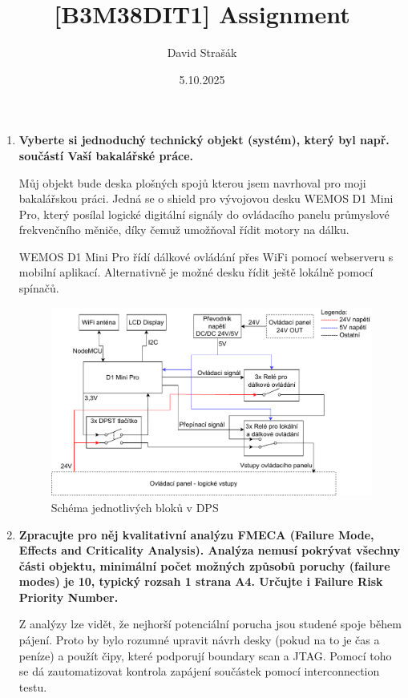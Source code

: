 \documentclass[10pt]{article} %
\title{[B3M38DIT1] Assignment}
\author{David Strašák}
\date{5.10.2025}
\begin{document}
	\maketitle
	
	\begin{enumerate}
		\item \textbf{Vyberte si jednoduchý technický objekt (systém), který byl např. součástí Vaší bakalářské práce. }
		
		Můj objekt bude deska plošných spojů kterou jsem navrhoval pro moji bakalářskou práci. Jedná se o shield pro vývojovou desku WEMOS D1 Mini Pro, který posílal logické digitální signály do ovládacího panelu průmyslové frekvenčního měniče, díky čemuž umožňoval řídit motory na dálku. 
		
		WEMOS D1 Mini Pro řídí dálkové ovládání přes WiFi pomocí webserveru s mobilní aplikací. Alternativně je možné desku řídit ještě lokálně pomocí spínačů.
		
		\begin{figure}[H]
			\centering
			\includegraphics[width=0.99\linewidth]{Electrical_Schematic_V2.drawio.pdf}
			\caption{Schéma jednotlivých bloků v DPS}
			\label{fig:pcb_layout}
		\end{figure}
		
		\clearpage
			
		
		\item \textbf{Zpracujte pro něj kvalitativní analýzu FMECA (Failure Mode, Effects and Criticality Analysis). Analýza nemusí pokrývat všechny části objektu, minimální počet možných způsobů poruchy (failure modes) je 10, typický rozsah 1 strana A4. Určujte i Failure Risk Priority Number.}
		
		Z analýzy lze vidět, že nejhorší potenciální porucha jsou studené spoje během pájení. Proto by bylo rozumné upravit návrh desky (pokud na to je čas a peníze) a použít čipy, které podporují boundary scan a JTAG. Pomocí toho se dá zautomatizovat kontrola zapájení součástek pomocí interconnection testu.
		

\end{enumerate}
\end{document}
